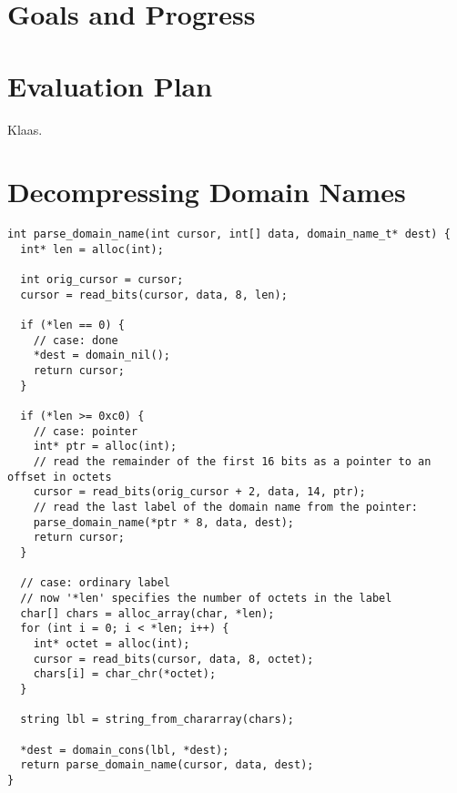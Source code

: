 \documentclass{article}
\begin{document}
\section{Goals and Progress}

\section{Evaluation Plan}

Klaas.


\nocite{rfc:1034, rfc:1035}



\clearpage
\appendix
\section{Decompressing Domain Names}\label{appendix:decompression}

\begin{lstlisting}
int parse_domain_name(int cursor, int[] data, domain_name_t* dest) {
  int* len = alloc(int);

  int orig_cursor = cursor;
  cursor = read_bits(cursor, data, 8, len);

  if (*len == 0) {
    // case: done
    *dest = domain_nil();
    return cursor;
  }

  if (*len >= 0xc0) {
    // case: pointer
    int* ptr = alloc(int);
    // read the remainder of the first 16 bits as a pointer to an offset in octets
    cursor = read_bits(orig_cursor + 2, data, 14, ptr);
    // read the last label of the domain name from the pointer:
    parse_domain_name(*ptr * 8, data, dest);
    return cursor;
  }

  // case: ordinary label
  // now '*len' specifies the number of octets in the label
  char[] chars = alloc_array(char, *len);
  for (int i = 0; i < *len; i++) {
    int* octet = alloc(int);
    cursor = read_bits(cursor, data, 8, octet);
    chars[i] = char_chr(*octet);
  }

  string lbl = string_from_chararray(chars);

  *dest = domain_cons(lbl, *dest);
  return parse_domain_name(cursor, data, dest);
}
\end{lstlisting}
\end{document}
